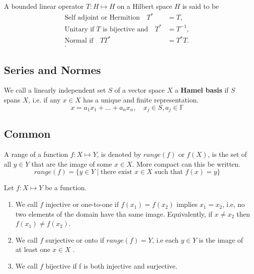 \documentclass{article}
\theoremstyle{remark}
\begin{document}
\begin{definition}
  A bounded linear operator $T: H \mapsto H$ on a Hilbert space $H$ is said to be 
  \begin{align*}
    \text{Self adjoint or Hermition} \quad T^{*} &= T ,\\
    \text{Unitary if $T$ is bijective and} \quad T^{*} &= T^{-1} ,\\
    \text{Normal if} \quad TT^{*} &= T^{*}T. \\ 
  .\end{align*}
  
\end{definition}


\subsection{Series and Normes}%
\label{sub:series_and_normes}

\begin{definition}
  We call a linearly independent set $S$ of a vector space $X$ a \textbf{Hamel basis} if $S$ spans $X$, i.e. if any $x \in X$ has a unique and finite representation. \[
  x  = a_1 x_1 + \ldots + a_{n} x_{n}, \quad x_{j} \in S, a_{j} \in \mathbb{F} 
  \] 
  
\end{definition}



\subsection{Common}%
\label{sub:common}

\begin{definition}[Range]
  A range of a function $f: X \mapsto Y$, is denoted by $range\left( f \right) $ or $f\left( X \right) $, is the set of all $y \in Y$ that are the image of some $x \in X$. More compact can this be written. \[
    range\left( f \right) = \{y \in Y  \mid \text{there exist } x \in X \text{ such that } f\left( x \right) = y\} 
  \] 
\end{definition}

\begin{definition}
  Let $f: X \mapsto Y$ be a function. 
  \begin{enumerate}
    \item We call $f$ injective or one-to-one if $f\left( x_1 \right)  = f\left( x_2 \right) $ implies $x_1=x_2$, i.e, no two elements of the domain have tha same image. Equivalently, if $x \neq x_2$ then $f\left( x_1 \right) \neq f\left( x_2 \right) $. 
    \item We call $f$ surjective or onto if $range\left( f \right) = Y$, i.e each $y \in Y$ is the image of at least one $x \in X$ .
    \item We call $f$ bijective if f is both injective and surjective.
  \end{enumerate}
\end{definition}
\end{document}

